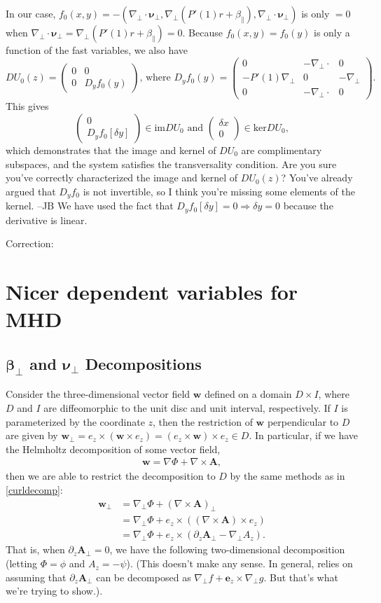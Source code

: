 \documentclass{article}
\newcommand{\para}{\parallel}
\newcommand{\np}{\nabla_\perp}
\newcommand{\p}{\partial}
\newcommand{\pth} [1] {\left( #1 \right) }
\newcommand{\pmat} [1] {\begin{pmatrix} #1 \end{pmatrix}}
\begin{document}
In our case, $f_0(x, y) = -(\np \cdot \bm{\nu}_\perp, \np \pth{P'(1)r + \beta_\para}, \np \cdot \bm{\nu}_\perp)$ is only $=0$ when $\np \cdot \bm{\nu}_\perp = \np \pth{P'(1)r + \beta_\para} = 0$. Because $f_0(x,y) = f_0(y)$ is only a function of the fast variables, we also have 
$$DU_0(z) = \pmat{0 & 0 \\ 0 & D_yf_0(y)} \text{, where } 
D_yf_0(y) =  \pmat{0 & -\np \cdot & 0 \\ -P'(1)\np & 0 & -\np \\ 0 & -\np \cdot & 0}. $$
This gives
$$\pmat{0 \\ D_yf_0[\delta y]} \in \text{im}DU_0 \text{ and }
\pmat{\delta x \\ 0} \in \text{ker}DU_0, $$
which demonstrates that the image and kernel of $DU_0$ are complimentary subspaces, and the system satisfies the transversality condition. {\color{red}Are you sure you've correctly characterized the image and kernel of $DU_0(z)$? You've already argued that $D_yf_0$ is not invertible, so I think you're missing some elements of the kernel. --JB} We have used the fact that $D_yf_0[\delta y] = 0 \Longrightarrow \delta y = 0$ because the derivative is linear. 

Correction: 


\section{Nicer dependent variables for MHD} \label{newvariables}
\subsection{$\bm{\beta}_\perp$ and $\bm{\nu}_\perp$ Decompositions}
Consider the three-dimensional vector field $\bm{w}$ defined on a domain $D\times I$, where $D$ and $I$ are diffeomorphic to the unit disc and unit interval, respectively. If $I$ is parameterized by the coordinate $z$, then the restriction of $\bm{w}$ perpendicular to $D $ are given by $\bm{w}_\perp = e_z\times (\bm{w} \times e_z) = (e_z\times \bm{w}) \times e_z \in D$. In particular, if we have the Helmholtz decomposition of some vector field, 
\begin{align} \label{helmholtz}
    \bm{w} = \nabla\Phi + \nabla\times \bm{A}, 
\end{align} 
then we are able to restrict the decomposition to $D$ by the same methods as in \eqref{curldecomp}: 
\begin{equation} \label{helmholtzperp} \begin{split}
    \bm{w}_\perp &= \np \Phi + \pth{\nabla\times \bm{A}}_\perp \\ 
    &= \np \Phi + e_z \times \pth{(\nabla\times \bm{A}) \times e_z} \\
    &= \np \Phi + e_z \times (\p_z \bm{A}_\perp - \np A_z). 
\end{split} \end{equation}
That is, when $\p_z \bm{A}_\perp = 0$, we have the following two-dimensional decomposition (letting $\Phi = \phi$ and $A_z = -\psi$). (This doesn't make any sense. In general, relies on assuming that $\p_z\bm{A}_\perp$ can be decomposed as $\np f + \bm{e}_z\times\np g$. But that's what we're trying to show.). 
\end{document}

